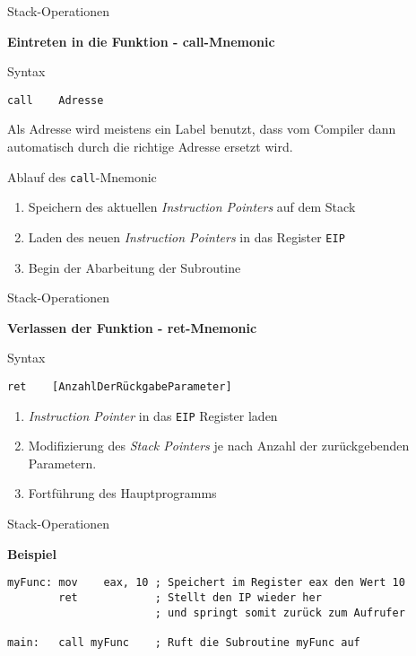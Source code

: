 \begin{frame}[fragile]{Stack-Operationen}

\begin{center}
\textbf{Eintreten in die Funktion - call-Mnemonic}
\end{center}

Syntax
\begin{lstlisting}
call    Adresse
\end{lstlisting}

Als Adresse wird meistens ein Label benutzt, dass vom Compiler dann automatisch durch die richtige Adresse ersetzt wird.

\makebox{}

Ablauf des \texttt{call}-Mnemonic
\begin{enumerate}
    \item Speichern des aktuellen \textit{Instruction Pointers} auf dem Stack
    \item Laden des neuen \textit{Instruction Pointers} in das Register \texttt{EIP}
    \item Begin der Abarbeitung der Subroutine
\end{enumerate}

\end{frame}


\begin{frame}[fragile]{Stack-Operationen}

\begin{center}
\textbf{Verlassen der Funktion - ret-Mnemonic}
\end{center}

Syntax
\begin{lstlisting}
ret    [AnzahlDerRückgabeParameter]
\end{lstlisting}

\makebox

\begin{enumerate}
    \item \textit{Instruction Pointer} in das \texttt{EIP} Register laden
    \item Modifizierung des \textit{Stack Pointers} je nach Anzahl der zurückgebenden Parametern.
    \item Fortführung des Hauptprogramms
\end{enumerate}
\end{frame}


\begin{frame}[fragile]{Stack-Operationen}

\begin{center}
\textbf{Beispiel}
\end{center}

\begin{lstlisting}
myFunc: mov    eax, 10 ; Speichert im Register eax den Wert 10
        ret            ; Stellt den IP wieder her
                       ; und springt somit zurück zum Aufrufer

main:   call myFunc    ; Ruft die Subroutine myFunc auf
\end{lstlisting}
\end{frame}
